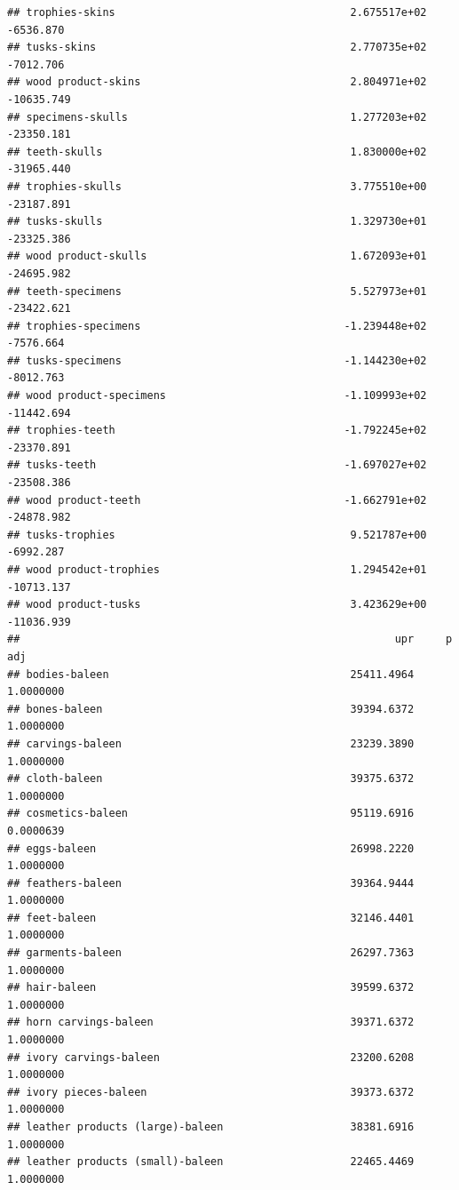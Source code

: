 \documentclass[
  12pt,
]{article}
\begin{document}
\begin{verbatim}
## trophies-skins                                     2.675517e+02   -6536.870
## tusks-skins                                        2.770735e+02   -7012.706
## wood product-skins                                 2.804971e+02  -10635.749
## specimens-skulls                                   1.277203e+02  -23350.181
## teeth-skulls                                       1.830000e+02  -31965.440
## trophies-skulls                                    3.775510e+00  -23187.891
## tusks-skulls                                       1.329730e+01  -23325.386
## wood product-skulls                                1.672093e+01  -24695.982
## teeth-specimens                                    5.527973e+01  -23422.621
## trophies-specimens                                -1.239448e+02   -7576.664
## tusks-specimens                                   -1.144230e+02   -8012.763
## wood product-specimens                            -1.109993e+02  -11442.694
## trophies-teeth                                    -1.792245e+02  -23370.891
## tusks-teeth                                       -1.697027e+02  -23508.386
## wood product-teeth                                -1.662791e+02  -24878.982
## tusks-trophies                                     9.521787e+00   -6992.287
## wood product-trophies                              1.294542e+01  -10713.137
## wood product-tusks                                 3.423629e+00  -11036.939
##                                                           upr     p adj
## bodies-baleen                                      25411.4964 1.0000000
## bones-baleen                                       39394.6372 1.0000000
## carvings-baleen                                    23239.3890 1.0000000
## cloth-baleen                                       39375.6372 1.0000000
## cosmetics-baleen                                   95119.6916 0.0000639
## eggs-baleen                                        26998.2220 1.0000000
## feathers-baleen                                    39364.9444 1.0000000
## feet-baleen                                        32146.4401 1.0000000
## garments-baleen                                    26297.7363 1.0000000
## hair-baleen                                        39599.6372 1.0000000
## horn carvings-baleen                               39371.6372 1.0000000
## ivory carvings-baleen                              23200.6208 1.0000000
## ivory pieces-baleen                                39373.6372 1.0000000
## leather products (large)-baleen                    38381.6916 1.0000000
## leather products (small)-baleen                    22465.4469 1.0000000

\end{verbatim}
\end{document}

